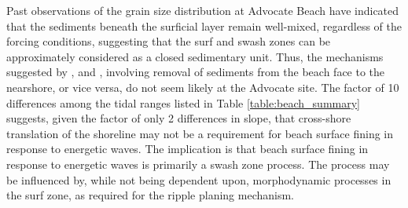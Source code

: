 Past observations of the grain size distribution at Advocate Beach have indicated that the sediments beneath the surficial layer remain well-mixed, regardless of the forcing conditions, suggesting that the surf and swash zones can be approximately considered as a closed sedimentary unit. Thus, the mechanisms suggested by \citeauthor{Pontee_etal2004}, and \citeauthor{Curtiss_etal2009}, involving removal of sediments from the beach face to the nearshore, or vice versa, do not seem likely at the Advocate site. The factor of 10 differences among the tidal ranges listed in Table \ref{table:beach_summary} suggests, given the factor of only 2 differences in slope, that cross-shore translation of the shoreline may not be a requirement for beach surface fining in response to energetic waves. The implication is that beach surface fining in response to energetic waves is primarily a swash zone process. The process may be influenced by, while not being dependent upon, morphodynamic processes in the surf zone, as required for the \citeauthor{Hay_etal2014} ripple planing mechanism. 

